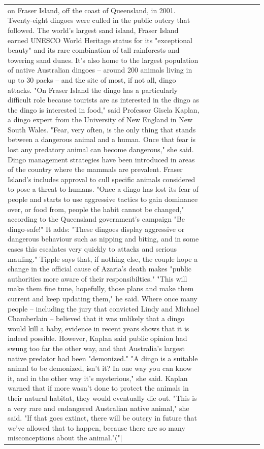 \begin{table}[H]
\begin{tabular}{lllrlllll}
on Fraser Island, off the coast of Queensland, in 2001. Twenty-eight dingoes were culled in the public outcry that followed. The world's largest sand island, Fraser Island earned UNESCO World Heritage status for its "exceptional beauty" and its rare combination of tall rainforests and towering sand dunes. It's also home to the largest population of native Australian dingoes -- around 200 animals living in up to 30 packs -- and the site of most, if not all, dingo attacks. "On Fraser Island the dingo has a particularly difficult role because tourists are as interested in the dingo as the dingo is interested in food," said Professor Gisela Kaplan, a dingo expert from the University of New England in New South Wales. "Fear, very often, is the only thing that stands between a dangerous animal and a human. Once that fear is lost any predatory animal can become dangerous," she said. Dingo management strategies have been introduced in areas of the country where the mammals are prevalent. Fraser Island's includes approval to cull specific animals considered to pose a threat to humans. "Once a dingo has lost its fear of people and starts to use aggressive tactics to gain dominance over, or food from, people the habit cannot be changed," according to the Queensland government's campaign "Be dingo-safe!" It adds: "These dingoes display aggressive or dangerous behaviour such as nipping and biting, and in some cases this escalates very quickly to attacks and serious mauling." Tipple says that, if nothing else, the couple hope a change in the official cause of Azaria's death makes "public authorities more aware of their responsibilties." "This will make them fine tune, hopefully, those plans and make them current and keep updating them," he said. Where once many people -- including the jury that convicted Lindy and Michael Chamberlain -- believed that it was unlikely that a dingo would kill a baby, evidence in recent years shows that it is indeed possible. However, Kaplan said public opinion had swung too far the other way, and that Australia's largest native predator had been "demonized." "A dingo is a suitable animal to be demonized, isn't it? In one way you can know it, and in the other way it's mysterious," she said. Kaplan warned that if more wasn't done to protect the animals in their natural habitat, they would eventually die out. "This is a very rare and endangered Australian native animal," she said. "If that goes extinct, there will be outcry in future that we've allowed that to happen, because there are so many misconceptions about the animal."("| \\

\end{tabular}
\end{table}

